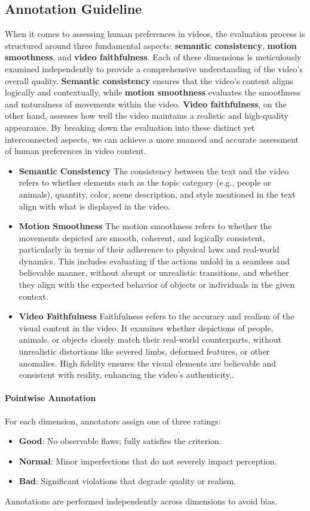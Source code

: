 \subsection{Annotation Guideline}
When it comes to assessing human preferences in videos, the evaluation process is structured around three fundamental aspects: \textbf{semantic consistency}, \textbf{motion smoothness}, and \textbf{video faithfulness}. Each of these dimensions is meticulously examined independently to provide a comprehensive understanding of the video's overall quality. \textbf{Semantic consistency} ensures that the video's content aligns logically and contextually, while \textbf{motion smoothness} evaluates the smoothness and naturalness of movements within the video. \textbf{Video faithfulness}, on the other hand, assesses how well the video maintains a realistic and high-quality appearance. By breaking down the evaluation into these distinct yet interconnected aspects, we can achieve a more nuanced and accurate assessment of human preferences in video content.

\begin{itemize}
    \item \textbf{Semantic Consistency} The consistency between the text and the video refers to whether elements such as the topic category (e.g., people or animals), quantity, color, scene description, and style mentioned in the text align with what is displayed in the video.
    
    \item \textbf{Motion Smoothness} The motion smoothness refers to whether the movements depicted are smooth, coherent, and logically consistent, particularly in terms of their adherence to physical laws and real-world dynamics. This includes evaluating if the actions unfold in a seamless and believable manner, without abrupt or unrealistic transitions, and whether they align with the expected behavior of objects or individuals in the given context.
    
    \item \textbf{Video Faithfulness} Faithfulness refers to the accuracy and realism of the visual content in the video. It examines whether depictions of people, animals, or objects closely match their real-world counterparts, without unrealistic distortions like severed limbs, deformed features, or other anomalies. High fidelity ensures the visual elements are believable and consistent with reality, enhancing the video's authenticity..
\end{itemize}
\paragraph{Pointwise Annotation} For each dimension, annotators assign one of three ratings:
\begin{itemize}
    \item \textbf{Good}: No observable flaws; fully satisfies the criterion.
    \item \textbf{Normal}: Minor imperfections that do not severely impact perception.
    \item \textbf{Bad}: Significant violations that degrade quality or realism.
\end{itemize}
Annotations are performed independently across dimensions to avoid bias.
